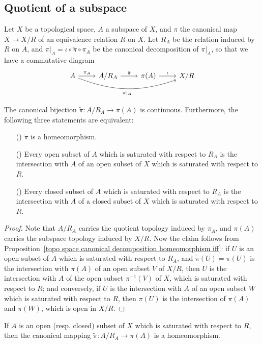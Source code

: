 \subsection{Quotient of a subspace}
Let $X$ be a topological space, $A$ a subspace of $X$, and $\pi$ the canonical map $X\to X/R$ of an equivalence relation $R$ on $X$. Let $R_A$ be the relation induced by $R$ on $A$, and $\pi|_A=\iota\circ\tilde{\pi}\circ\pi_A$ be the canonical decomposition of $\pi|_A$, so that we have a commutative diagram
\[\begin{tikzcd}
A\ar[rrr,bend right=20pt,swap,"\pi|_A"]\ar[r,"\pi_A"]&A/R_A\ar[r,"\tilde{\pi}"]&\pi(A)\ar[r,"\iota"]&X/R
\end{tikzcd}\]
\begin{proposition}\label{topo space quotient topology on subspace iff}
The canonical bijection $\tilde{\pi}:A/R_A\to\pi(A)$ is continuous. Furthermore, the following three statements are equivalent:
\begin{itemize}
\item[(\rmnum{1})] $\tilde{\pi}$ is a homeomorphism.
\item[(\rmnum{2})] Every open subset of $A$ which is saturated with respect to $R_A$ is the intersection with $A$ of an open subset of $X$ which is saturated with respect to $R$.
\item[(\rmnum{3})] Every closed subset of $A$ which is saturated with respect to $R_A$ is the intersection with $A$ of a closed subset of $X$ which is saturated with respect to $R$. 
\end{itemize}
\end{proposition}
\begin{proof}
Note that $A/R_A$ carries the quotient topology induced by $\pi_A$, and $\pi(A)$ carries the subspace topology induced by $X/R$. Now the claim follows from Proposition~\ref{topo space canonical decomposition homeomorphism iff}: if $U$ is an open subset of $A$ which is saturated with respect to $R_A$, and $\tilde{\pi}(U)=\pi(U)$ is the intersection with $\pi(A)$ of an open subset $V$ of $X/R$, then $U$ is the intersection with $A$ of the open subset $\pi^{-1}(V)$ of $X$, which is saturated with respect to $R$; and conversely, if $U$ is the intersection with $A$ of an open subset $W$ which is saturated with respect to $R$, then $\pi(U)$ is the intersection of $\pi(A)$ and $\pi(W)$, which is open in $X/R$.
\end{proof}
\begin{corollary}\label{topo space quotient map on saturated open set is quotient map}
If $A$ is an open (resp. closed) subset of $X$ which is saturated with respect to $R$, then the canonical mapping $\tilde{\pi}:A/R_A\to\pi(A)$ is a homeomorphism.
\end{corollary}
